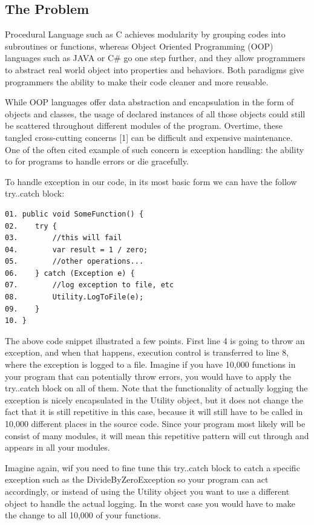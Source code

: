 \subsection{The Problem}
Procedural Language such as C achieves modularity by grouping codes into subroutines or functions, whereas Object Oriented Programming (OOP) languages such as JAVA or C\# go one step further, and they allow programmers to abstract real world object into properties and behaviors. Both paradigms give programmers the ability to make their code cleaner and more reusable.

While OOP languages offer data abstraction and encapsulation in the form of objects and classes, the usage of declared instances of all those objects could still be scattered throughout different modules of the program. Overtime, these tangled cross-cutting concerns [1] can be difficult and expensive maintenance. One of the often cited example of such concern is exception handling: the ability to for programs to handle errors or die gracefully.

To handle exception in our code, in its most basic form we can have the follow try..catch block:
\begin{verbatim}
01. public void SomeFunction() {
02.    try {
03.        //this will fail
04.        var result = 1 / zero;
05.        //other operations...
06.    } catch (Exception e) {
07.        //log exception to file, etc
08.        Utility.LogToFile(e);
09.    }
10. }
\end{verbatim}

The above code snippet illustrated a few points. First line 4 is going to throw an exception, and when that happens, execution control is transferred to line 8, where the exception is logged to a file. Imagine if you have 10,000 functions in your program that can potentially throw errors, you would have to apply the try..catch block on all of them. Note that the functionality of actually logging the exception is nicely encapsulated in the Utility object, but it does not change the fact that it is still repetitive in this case, because it will still have to be called in 10,000 different places in the source code. Since your program most likely will be consist of many modules, it will mean this repetitive pattern will cut through and appears in all your modules.

Imagine again, wif you need to fine tune this try..catch block to catch a specific exception such as the DivideByZeroException so your program can act accordingly, or instead of using the Utility object you want to use a different object to handle the actual logging. In the worst case you would have to make the change to all 10,000 of your functions.

